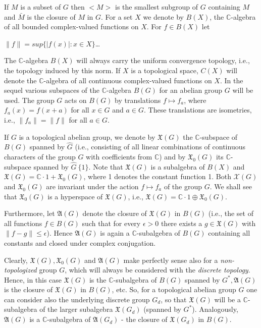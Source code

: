 \documentclass[12pt]{article}
\begin{document}
    
    If $M$ is a subset of $G$ then $<M>$ is the smallest subgroup of $G$ containing $M$ and $\bar{M}$ is the closure of $M$ in $G$.
    For a set $X$ we denote by $B(X)$, the $\mathbb{C}$-algebra of all bounded complex-valued functions on $X$. For $f \in B(X)$ let


    $\|f\| = sup\{|f(x)|: x \in X\}$\dots


        The $\mathbb{C}$-algebra $B(X)$ will always carry the uniform convergence topology, i.e., the topology induced by this norm. If $X$ is a
    topological space, $C(X)$ will denote the $\mathbb{C}$-algebra of all continuous complex-valued functions on $X$.
    In the sequel various subspaces of the $\mathbb{C}$-algebra $B(G)$ for an abelian group $G$ will be used. The group $G$ acts on $B(G)$
    by translations $f \mapsto f_a$, where $f_a (x) = f (x + a)$ for all $x \in G$ and $a \in G$. These translations are isometries, i.e., $\| f_a \|=\| f \|$ for
    all $a \in G$.


        If $G$ is a topological abelian group, we denote by $\mathfrak{X} (G)$ the $\mathbb{C}$-subspace of $B(G)$ spanned by $\widehat{G}$ (i.e., consisting of all linear
    combinations of continuous characters of the group $G$ with coefficients from $\mathbb{C}$) and by $\mathfrak{X}_0(G)$ its $\mathbb{C}$-subspace spanned by
    $\widehat{G} \ \{1\}$. Note that $\mathfrak{X}(G)$ is a subalgebra of $B(X)$ and $\mathfrak{X}(G) = \mathbb{C} · 1 + \mathfrak{X}_0(G)$, where 1 denotes the constant function 1. Both
    $\mathcal{X} (G)$ and $\mathfrak{X}_0(G)$ are invariant under the action $f \mapsto f_a$ of the group $G$. We shall see that $\mathfrak{X}_0(G)$ is a hyperspace of $\mathfrak{X}(G)$,
    i.e., $\mathfrak{X}(G) = \mathbb{C} · 1 \oplus \mathfrak{X}_0(G)$.
        
    
        Furthermore, let $\mathfrak{A}(G)$ denote the closure of $\mathfrak{X}(G)$ in $B(G)$ (i.e., the set of all functions $f \in B(G)$ such that for every $\epsilon > 0$
    there exists a $g \in \mathfrak{X}(G)$ with $\| f - g \| \leqslant \epsilon$). Hence $\mathfrak{A}(G)$ is again a $\mathbb{C}$-subalgebra of $B(G)$ containing all constants and closed
    under complex conjugation.
    
    
        Clearly, $\mathfrak{X}(G), \mathfrak{X}_0(G)$ and $\mathfrak{A}(G)$ make perfectly sense also for a \emph{non-topologized} group $G$, which will always be considered
    with the \emph{discrete topology}. Hence, in this case $\mathfrak{X}(G)$ is the $\mathbb{C}$-subalgebra of $B(G)$ spanned by $G^*, \mathfrak{A}(G)$ is the closure of $\mathfrak{X}(G)$
    in $B(G)$, etc. So, for a topological abelian group $G$ one can consider also the underlying discrete group $G_d$, so that $\mathfrak{X}(G)$ will
    be a $\mathbb{C}$-subalgebra of the larger subalgebra $\mathfrak{X}(G_d)$ (spanned by $G^*$). Analogously, $\mathfrak{A}(G)$ is a $\mathbb{C}$-subalgebra of $\mathfrak{A}(G_d)$ - the
    closure of $\mathfrak{X}(G_d)$ in $B(G)$.
\end{document}
